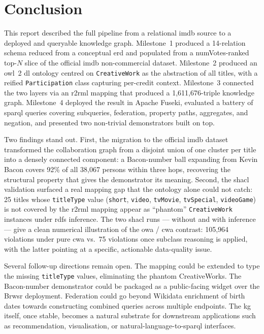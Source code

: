 \section{Conclusion}

This report described the full pipeline from a relational \ac{imdb} source to a deployed and queryable knowledge graph. Milestone~1 produced a 14-relation schema reduced from a conceptual \ac{erd} and populated from a numVotes-ranked top-$N$ slice of the official \ac{imdb} non-commercial dataset. Milestone~2 produced an \ac{owl}~2 \ac{dl} ontology centred on \texttt{CreativeWork} as the abstraction of all titles, with a reified \texttt{Participation} class capturing per-credit context. Milestone~3 connected the two layers via an \ac{r2rml} mapping that produced a 1{,}611{,}676-triple knowledge graph. Milestone~4 deployed the result in Apache Fuseki, evaluated a battery of \ac{sparql} queries covering subqueries, federation, property paths, aggregates, and negation, and presented two non-trivial demonstrators built on top.

Two findings stand out. First, the migration to the official \ac{imdb} dataset transformed the collaboration graph from a disjoint union of one cluster per title into a densely connected component: a Bacon-number ball expanding from Kevin Bacon covers 92\% of all 38{,}067 persons within three hops, recovering the structural property that gives the demonstrator its meaning. Second, the \ac{shacl} validation surfaced a real mapping gap that the ontology alone could not catch: 25 titles whose \texttt{titleType} value (\texttt{short}, \texttt{video}, \texttt{tvMovie}, \texttt{tvSpecial}, \texttt{videoGame}) is not covered by the \ac{r2rml} mapping appear as ``phantom'' \texttt{CreativeWork} instances under \ac{rdfs} inference. The two \ac{shacl} runs --- without and with inference --- give a clean numerical illustration of the \ac{owa} / \ac{cwa} contrast: 105{,}964 violations under pure \ac{cwa} vs.\ 75 violations once subclass reasoning is applied, with the latter pointing at a specific, actionable data-quality issue.

Several follow-up directions remain open. The mapping could be extended to type the missing \texttt{titleType} values, eliminating the phantom CreativeWorks. The Bacon-number demonstrator could be packaged as a public-facing widget over the Brwsr deployment. Federation could go beyond Wikidata enrichment of birth dates towards constructing combined queries across multiple endpoints. The \ac{kg} itself, once stable, becomes a natural substrate for downstream applications such as recommendation, visualisation, or natural-language-to-\ac{sparql} interfaces.
